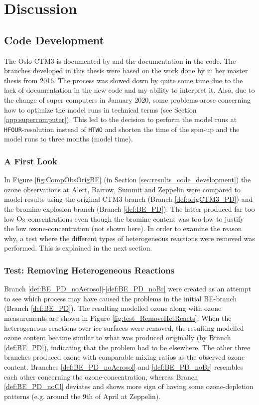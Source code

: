 \setcounter{chapter}{6}
\chapter{Discussion}\label{chap:discussion}

\section{Code Development}\label{sec:discussion_code_development}

The Oslo CTM3 is documented by \cite{SovdeManual} and the documentation in the code. The branches developed in this thesis were based on the work done by \cite{Susanne} in her master thesis from 2016. The process was slowed down by quite some time due to the lack of documentation in the new code and my ability to interpret it. Also, due to the change of super computers in January 2020, some problems arose concerning how to optimize the model runs in technical terms (see Section \ref{app:supercomputer}). This led to the decision to perform the model runs at \texttt{HFOUR}-resolution instead of \texttt{HTWO} and shorten the time of the spin-up and the model runs to three months (model time). 



\subsection{A First Look}

In Figure \ref{fig:CompObsOrigBE} (in Section \ref{sec:results_code_development}) the ozone observations at Alert, Barrow, Summit and Zeppelin were compared to model results using the original CTM3 branch (Branch \ref{def:origCTM3_PD}) and the bromine explosion branch (Branch \ref{def:BE_PD}). The latter produced far too low $\mathrm{O_3}$-concentrations even though the bromine content was too low to justify the low ozone-concentration (not shown here). In order to examine the reason why, a test where the different types of heterogeneous reactions were removed was performed. This is explained in the next section. 

\subsection{Test: Removing Heterogeneous Reactions}

Branch \ref{def:BE_PD_noAerosol}-\ref{def:BE_PD_noBr} were created as an attempt to see which process may have caused the problems in the initial BE-branch (Branch \ref{def:BE_PD}). The resulting modelled ozone along with ozone measurements are shown in Figure \ref{fig:test_RemoveHetReacts}. When the heterogeneous reactions over ice surfaces were removed, the resulting modelled ozone content became similar to what was produced originally (by Branch \ref{def:BE_PD}), indicating that the problem had to be elsewhere. The other three branches produced ozone with comparable mixing ratios as the observed ozone content. Branches \ref{def:BE_PD_noAerosol} and \ref{def:BE_PD_noBr} resembles each other concerning the ozone-concentration, whereas Branch \ref{def:BE_PD_noCl} deviates and shows more sign of having some ozone-depletion patterns (e.g. around the 9th of April at Zeppelin). 

